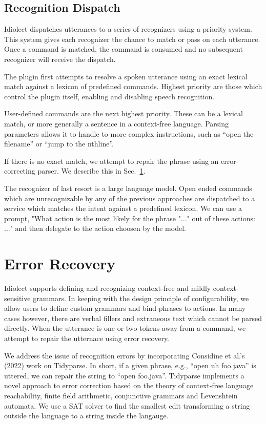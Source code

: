 \documentclass[conference]{IEEEtran}
\begin{document}
\subsection{Recognition Dispatch}

Idiolect dispatches utterances to a series of recognizers using a priority system. This system gives each recognizer the chance to match or pass on each utterance. Once a command is matched, the command is consumed and no subsequent recognizer will receive the dispatch.

The plugin first attempts to resolve a spoken utterance using an exact lexical match against a lexicon of predefined commands. Highest priority are those which control the plugin itself, enabling and disabling speech recognition.

User-defined commands are the next highest priority. These can be a lexical match, or more generally a sentence in a context-free language. Parsing parameters allows it to handle to more complex instructions, such as ``open the \textlangle filename'' or ``jump to the \textlangle nth\textrangle line''.

If there is no exact match, we attempt to repair the phrase using an error-correcting parser. We describe this in Sec.~\ref{sec:error}.

The recognizer of last resort is a large language model. Open ended commands which are unrecognizable by any of the previous approaches are dispatched to a service which matches the intent against a predefined lexicon. We can use a prompt, "What action is the most likely for the phrase "..." out of these actions: ..." and then delegate to the action choosen by the model.

\section{Error Recovery}\label{sec:error}

Idiolect supports defining and recognizing context-free and mildly context-sensitive grammars. In keeping with the design principle of configurability, we allow users to define custom grammars and bind phrases to actions. In many cases however, there are verbal fillers and extraneous text which cannot be parsed directly. When the utterance is one or two tokens away from a command, we attempt to repair the utternace using error recovery.

We address the issue of recognition errors by incorporating Considine et al.'s (2022) work on Tidyparse. In short, if a given phrase, e.g., ``open uh foo.java'' is uttered, we can repair the string to ``open foo.java''. Tidyparse implements a novel approach to error correction based on the theory of context-free language reachability, finite field arithmetic, conjunctive grammars and Levenshtein automata. We use a SAT solver to find the smallest edit transforming a string outside the language to a string inside the langauge.
\end{document}
